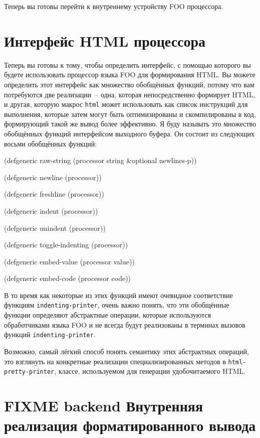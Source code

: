 Теперь вы готовы перейти к внутреннему устройству FOO процессора. 

\section{Интерфейс HTML процессора}

Теперь вы готовы к тому, чтобы определить интерфейс, с помощью которого вы будете
использовать процессор языка FOO для формирования HTML. Вы можете определить этот
интерфейс как множество обобщённых функций, потому что вам потребуются две реализации~--
одна, которая непосредственно формирует HTML, и другая, которую макрос \lstinline{html} может
использовать как список инструкций для выполнения, которые затем могут быть оптимизированы
и скомпилированы в код, формирующий такой же вывод более эффективно. Я буду называть это
множество обобщённых функций интерфейсом выходного буфера. Он состоит из следующих восьми
обобщённых функций:

\begin{myverb}
(defgeneric raw-string (processor string &optional newlines-p))

(defgeneric newline (processor))

(defgeneric freshline (processor))

(defgeneric indent (processor))

(defgeneric unindent (processor))

(defgeneric toggle-indenting (processor))

(defgeneric embed-value (processor value))

(defgeneric embed-code (processor code))
\end{myverb}

В то время как некоторые из этих функций имеют очевидное соответствие функциям
\lstinline{indenting-printer}, очень важно понять, что эти обобщённые функции определяют
абстрактные операции, которые используются обработчиками языка FOO и не всегда будут
реализованы в терминах вызовов функций \lstinline{indenting-printer}.

Возможно, самый лёгкий способ понять семантику этих абстрактных операций, это взглянуть на
конкретные реализации специализированных методов в \lstinline{html-pretty-printer}, классе,
используемом для генерации удобочитаемого HTML.

\section{FIXME backend Внутренняя реализация форматированного вывода}


